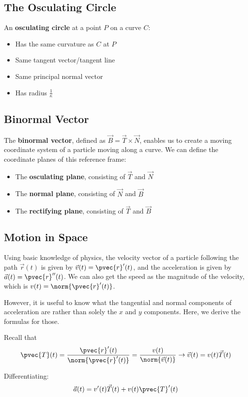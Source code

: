 \documentclass[12pt]{article}
\begin{document}
\begin{enumerate}
\subsection{The Osculating Circle}
An \textbf{osculating circle} at a point $P$ on a curve $C$:
\begin{itemize}
\item Has the same curvature as $C$ at $P$
\item Same tangent vector/tangent line
\item Same principal normal vector
\item Has radius $\frac{1}{\kappa}$
\end{itemize}

\subsection{Binormal Vector}
The \textbf{binormal vector}, defined as $\vec{B} = \vec{T} \times \vec{N}$, enables us to create a moving coordinate system of a particle moving along a curve. We can define the coordinate planes of this reference frame:
\begin{itemize}
\item The \textbf{osculating plane}, consisting of $\vec{T}$ and $\vec{N}$
\item The \textbf{normal plane}, consisting of $\vec{N}$ and $\vec{B}$
\item The \textbf{rectifying plane}, consisting of $\vec{T}$ and $\vec{B}$
\end{itemize}

\subsection{Motion in Space}
Using basic knowledge of physics, the velocity vector of a particle following the path $\vec{r}(t)$ is given by $\vec{v}(t) = \pvec{r}'(t)$, and the acceleration is given by $\vec{a}(t) = \pvec{r}''(t)$. We can also get the speed as the magnitude of the velocity, which is $v(t) = \norm{\pvec{r}'(t)}$.

However, it is useful to know what the tangential and normal components of acceleration are rather than solely the $x$ and $y$ components. Here, we derive the formulas for those.

Recall that \[ \pvec{T}(t) = \frac{\pvec{r}'(t)}{\norm{\pvec{r}'(t)}} = \frac{v(t)}{\norm{\vec{v}(t)}} \rightarrow \vec{v}(t) = v(t)\vec{T}(t) \]

Differentiating: \[ \vec{a}(t) = v'(t)\vec{T}(t) + v(t)\pvec{T}'(t) \]


\end{enumerate}
\end{document}
